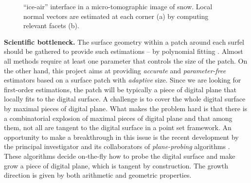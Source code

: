 \begin{figure}[hb]
  \centering
%
%
%
%
%
\caption{``ice-air'' interface in a micro-tomographic image of
  snow\protect\footnotemark. Local normal vectors are estimated
  at each corner (a) by computing relevant facets (b).} 
\label{fig:snow} 
\end{figure}

\noindent\textbf{Scientific bottleneck.}
The surface geometry within a patch around each surfel should be gathered to provide such estimations
-- \eg by polynomial fitting \cite{Cazals2005,Cazals2008}.
Almost all methods require at least one parameter that controls the size of the patch.  
On the other hand, this project aims at providing \emph{accurate} and \emph{parameter-free} estimators
based on a surface patch with \emph{adaptive} size.
Since we are looking for first-order estimations, the patch will be typically a piece of digital plane
that locally fits to the digital surface. %
A challenge is to cover the whole digital surface by maximal pieces of digital plane. 
What makes the problem hard is that there is a combinatorial explosion
of maximal pieces of digital plane \cite{Sivignon2009} and that among them,
not all are tangent to the digital surface in a point set framework.  
An opportunity to make a breakthrough in this issue is the recent development
by the principal investigator and its collaborators of \emph{plane-probing}
algorithms \cite{LPRTCS2016, LPRDGCI2016, LPRJMIV2017}. These algorithms decide
on-the-fly how to probe the digital surface and make grow a piece of digital plane,
which is tangent by construction. The growth direction is given by both arithmetic and geometric properties.


